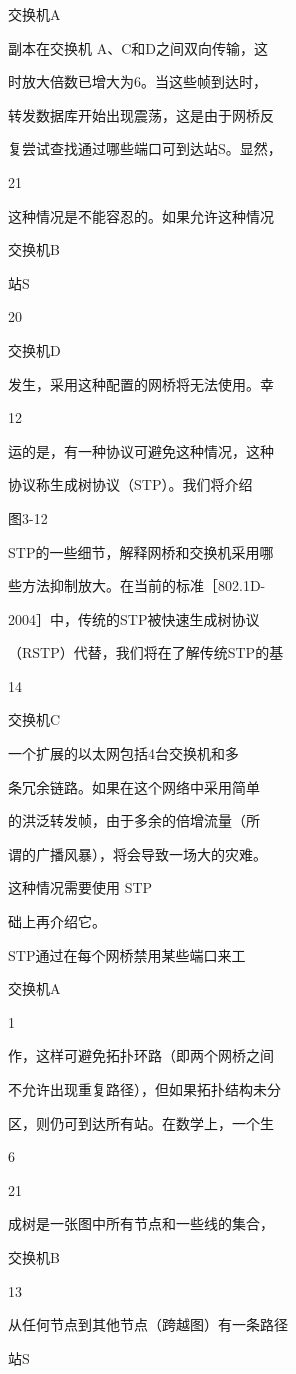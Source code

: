 交换机A

副本在交换机 A、C和D之间双向传输，这

时放大倍数已增大为6。当这些帧到达时，

转发数据库开始出现震荡，这是由于网桥反

复尝试查找通过哪些端口可到达站S。显然，

21

这种情况是不能容忍的。如果允许这种情况

交换机B

站S

20

交换机D

发生，采用这种配置的网桥将无法使用。幸

12

运的是，有一种协议可避免这种情况，这种

协议称生成树协议（STP）。我们将介绍

图3-12

STP的一些细节，解释网桥和交换机采用哪

些方法抑制放大。在当前的标准［802.1D-

2004］中，传统的STP被快速生成树协议

（RSTP）代替，我们将在了解传统STP的基

14

交换机C

一个扩展的以太网包括4台交换机和多

条冗余链路。如果在这个网络中采用简单

的洪泛转发帧，由于多余的倍增流量（所

谓的广播风暴），将会导致一场大的灾难。

这种情况需要使用 STP

础上再介绍它。

STP通过在每个网桥禁用某些端口来工

交换机A

1

作，这样可避免拓扑环路（即两个网桥之间

不允许出现重复路径），但如果拓扑结构未分

区，则仍可到达所有站。在数学上，一个生

6

21

成树是一张图中所有节点和一些线的集合，

交换机B

13

从任何节点到其他节点（跨越图）有一条路径

站S

